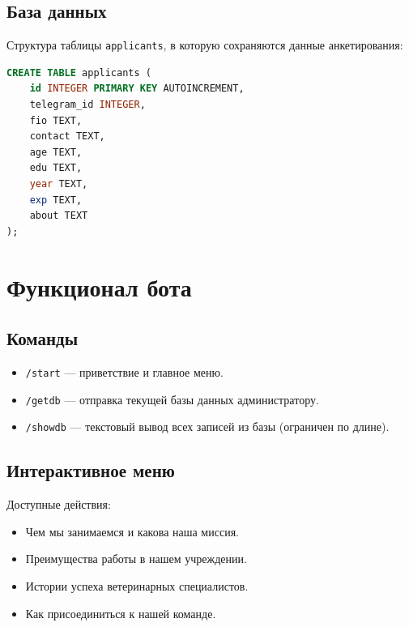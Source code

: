 \documentclass[a4paper,12pt]{article} %
\begin{document}
\newpage
\subsection{База данных}%
Структура таблицы \texttt{applicants}, в которую сохраняются данные анкетирования: %

\begin{lstlisting}[language=SQL, basicstyle=\ttfamily\small, backgroundcolor=\color{gray!10}]
CREATE TABLE applicants (
    id INTEGER PRIMARY KEY AUTOINCREMENT,
    telegram_id INTEGER,
    fio TEXT,
    contact TEXT,
    age TEXT,
    edu TEXT,
    year TEXT,
    exp TEXT,
    about TEXT
);
\end{lstlisting}

\section{Функционал бота}
\subsection{Команды}%
\begin{itemize}
    \item \texttt{/start} — приветствие и главное меню. %
    \item \texttt{/getdb} — отправка текущей базы данных администратору. %
    \item \texttt{/showdb} — текстовый вывод всех записей из базы (ограничен по длине).%
\end{itemize}

\subsection{Интерактивное меню} %
Доступные действия:
\begin{itemize}
    \item Чем мы занимаемся и какова наша миссия. %
    \item Преимущества работы в нашем учреждении. %
    \item Истории успеха ветеринарных специалистов.%
    \item Как присоединиться к нашей команде. %
\end{itemize}
\end{document}
